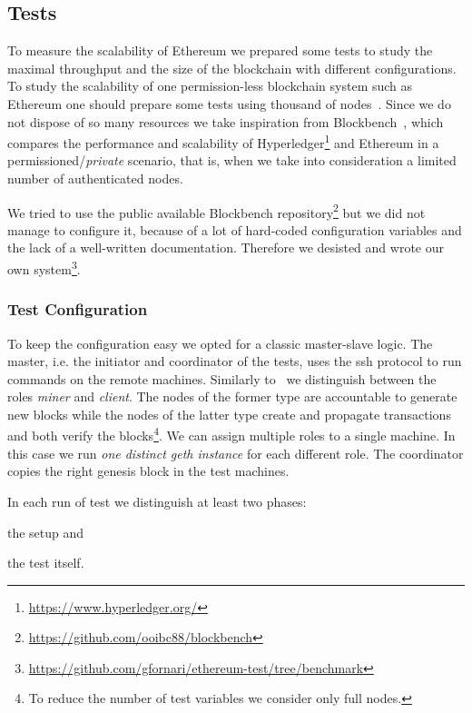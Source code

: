 \subsection{Tests}
\label{sec:tests}

To measure the scalability of Ethereum we prepared some tests to study the
maximal throughput and the size of the blockchain with different configurations.
To study the scalability of one permission-less blockchain system such as
Ethereum one should prepare some tests using thousand of
nodes~\cite{bib:securityAndScalabilityPoW, bib:algorand}. Since we do not
dispose of so many resources we take inspiration from
Blockbench~\cite{blockbench}, which compares the performance and scalability of
Hyperledger\footnote{\url{https://www.hyperledger.org/}} and Ethereum in a
permissioned/\emph{private} scenario, that is, when we take into consideration
a limited number of authenticated nodes.

We tried to use the public available Blockbench
repository\footnote{\url{https://github.com/ooibc88/blockbench}} but we did not
manage to configure it, because of a lot of hard-coded configuration variables
and the lack of a well-written documentation. Therefore we desisted and wrote
our own 
system\footnote{\url{https://github.com/gfornari/ethereum-test/tree/benchmark}}.


\subsubsection{Test Configuration}

To keep the configuration easy we opted for a classic master-slave logic. The
master, i.e. the initiator and coordinator of the tests, uses the ssh protocol
to run commands on the remote machines. Similarly to~\cite{blockbench} we
distinguish between the roles \emph{miner} and \emph{client}. The nodes of the
former type are accountable to generate new blocks while the nodes of the latter
type create and propagate transactions and both verify the blocks\footnote{To
reduce the number of test variables we consider only full nodes.}. We can assign
multiple roles to a single machine. In this case we run \emph{one distinct geth
instance} for each different role. The coordinator copies the right genesis
block in the test machines.

In each run of test we distinguish at least two phases:
\begin{enumerate*}
  \item the setup and
  \item the test itself.
\end{enumerate*}

